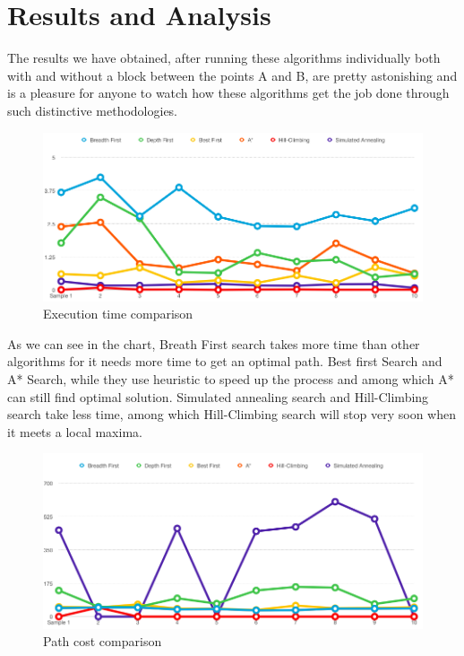 \documentclass[a4paper]{article}
\begin{document}

\section{Results and Analysis}

The results we have obtained, after running these algorithms individually both with and without a block between the points A and B, are pretty astonishing and is a pleasure for anyone to watch how these algorithms get the job done through such distinctive methodologies.\\

\begin{figure}[h!]
  \centering
    \includegraphics[scale=.4]{images/execution_time.png}
  \caption{Execution time comparison}
\end{figure}

\noindent As we can see in the chart, Breath First search takes more time than other algorithms for it needs more time to get an optimal path. Best first Search and A* Search, while they use heuristic to speed up the process and among which A* can still find optimal solution. Simulated annealing search and Hill-Climbing search take less time, among which Hill-Climbing search will stop very soon when it meets a local maxima. \\

\begin{figure}[h!]
  \centering
    \includegraphics[scale=.4]{images/path_cost.png}
  \caption{Path cost comparison}
\end{figure}
\end{document}
